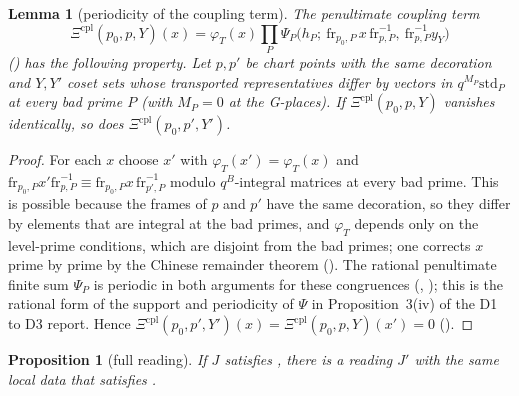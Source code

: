 \documentclass[11pt]{article}
\newtheorem{proposition}[theorem]{Proposition}
\newtheorem{lemma}[theorem]{Lemma}
\theoremstyle{remark}
\begin{document}
\begin{lemma}[periodicity of the coupling term]\label{lem:per}
The penultimate coupling term
\[
\Xi^{\mathrm{cpl}}(p_0,p,Y)(x)=\varphi_T(x)\prod_{P}\Psi_P\big(h_P;\ \mathrm{fr}_{p_0,P}\,x\,\mathrm{fr}_{p,P}^{-1},\ \mathrm{fr}_{p,P}^{-1}y_Y\big)
\]
() has the following property. Let $p,p'$ be chart points with the same decoration and $Y,Y'$ coset sets whose transported representatives differ by vectors in $q^{M_P}\mathrm{std}_P$ at every bad prime $P$ (with $M_P=0$ at the G-places). If $\Xi^{\mathrm{cpl}}(p_0,p,Y)$ vanishes identically, so does $\Xi^{\mathrm{cpl}}(p_0,p',Y')$.
\end{lemma}

\begin{proof}
For each $x$ choose $x'$ with $\varphi_T(x')=\varphi_T(x)$ and $\mathrm{fr}_{p_0,P}x'\mathrm{fr}_{p,P}^{-1}\equiv\mathrm{fr}_{p_0,P}x\,\mathrm{fr}_{p',P}^{-1}$ modulo $q^{B}$-integral matrices at every bad prime. This is possible because the frames of $p$ and $p'$ have the same decoration, so they differ by elements that are integral at the bad primes, and $\varphi_T$ depends only on the level-prime conditions, which are disjoint from the bad primes; one corrects $x$ prime by prime by the Chinese remainder theorem (). The rational penultimate finite sum $\Psi_P$ is periodic in both arguments for these congruences (, ); this is the rational form of the support and periodicity of $\Psi$ in Proposition~3(iv) of the D1 to D3 report. Hence $\Xi^{\mathrm{cpl}}(p_0,p',Y')(x)=\Xi^{\mathrm{cpl}}(p_0,p,Y)(x')=0$ ().
\end{proof}

\begin{proposition}[full reading]\label{prop:full}
If $J$ satisfies , there is a reading $J'$ with the same local data that satisfies .
\end{proposition}
\end{document}
